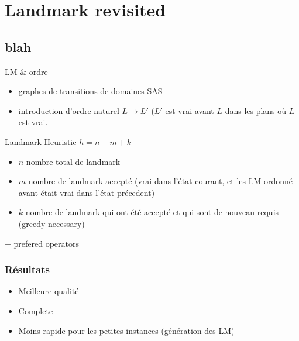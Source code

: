 \section{Landmark revisited}
  \subsection*{blah}

\begin{frame}
  
  \begin{block}{}
    
  \end{block}

  \begin{block}{LM \& ordre}
    \begin{itemize}
      \item graphes de transitions de domaines SAS\up{+}
      \item introduction d'ordre naturel $L → L'$ ($L'$ est vrai avant $L$ dans les plans où $L$ est vrai.
    \end{itemize}

  \end{block}
\end{frame}

\begin{frame}
  \begin{block}{Landmark Heuristic}
    $h = n - m + k$
    \begin{itemize}
      \item $n$ nombre total de landmark
      \item $m$ nombre de landmark accepté (vrai dans l'état courant, et les LM ordonné avant était vrai dans l'état précedent)
      \item $k$ nombre de landmark qui ont été accepté et qui sont de nouveau requis (greedy-necessary)
    \end{itemize}

    + prefered operators
  \end{block}
\end{frame}

\begin{frame}
  \frametitle{Résultats}

  \begin{block}{}
    \begin{itemize}
      \item Meilleure qualité
      \item Complete
      \item Moins rapide pour les petites instances (génération des LM)
    \end{itemize}
  \end{block}
\end{frame}
